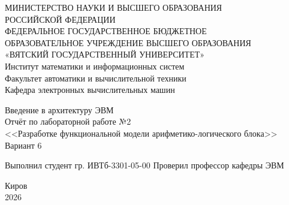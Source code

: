 \documentclass[oneside,a4paper,14pt]{extarticle}
\begin{document}
\newpage\thispagestyle{empty}
\begin{center}
	МИНИСТЕРСТВО НАУКИ И ВЫСШЕГО ОБРАЗОВАНИЯ\\
	РОССИЙСКОЙ ФЕДЕРАЦИИ\\
	ФЕДЕРАЛЬНОЕ ГОСУДАРСТВЕННОЕ БЮДЖЕТНОЕ\\
	ОБРАЗОВАТЕЛЬНОЕ УЧРЕЖДЕНИЕ ВЫСШЕГО ОБРАЗОВАНИЯ\\
	«ВЯТСКИЙ ГОСУДАРСТВЕННЫЙ УНИВЕРСИТЕТ»\\
	Институт математики и информационных систем\\
	Факультет автоматики и вычислительной техники\\
	Кафедра электронных вычислительных машин
\end{center}
\vspace{20mm}
\begin{center}
	Введение в архитектуру ЭВМ\\
	Отчёт по лабораторной работе №2\\
	<<Разработке функциональной модели арифметико-логического блока>>\\
	Вариант 6
\end{center}
\vfill
Выполнил студент гр. ИВТб-3301-05-00 \hfill
{}
Проверил профессор кафедры ЭВМ\hfill
{}
\vfill
\begin{center}
	Киров\\
	2026
\end{center}
\end{document}
